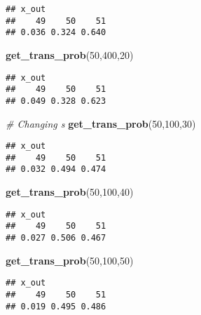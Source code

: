 \documentclass[
]{article}
\newenvironment{Shaded}{\begin{snugshade}}{\end{snugshade}}
\newcommand{\CommentTok}[1]{\textcolor[rgb]{0.56,0.35,0.01}{\textit{#1}}}
\newcommand{\DecValTok}[1]{\textcolor[rgb]{0.00,0.00,0.81}{#1}}
\newcommand{\FunctionTok}[1]{\textcolor[rgb]{0.13,0.29,0.53}{\textbf{#1}}}
\newcommand{\NormalTok}[1]{#1}
\begin{document}
\begin{verbatim}
## x_out
##    49    50    51 
## 0.036 0.324 0.640
\end{verbatim}

\begin{Shaded}
\begin{Highlighting}[]
\FunctionTok{get\_trans\_prob}\NormalTok{(}\DecValTok{50}\NormalTok{,}\DecValTok{400}\NormalTok{,}\DecValTok{20}\NormalTok{)}
\end{Highlighting}
\end{Shaded}

\begin{verbatim}
## x_out
##    49    50    51 
## 0.049 0.328 0.623
\end{verbatim}

\begin{Shaded}
\begin{Highlighting}[]
\CommentTok{\# Changing s}
\FunctionTok{get\_trans\_prob}\NormalTok{(}\DecValTok{50}\NormalTok{,}\DecValTok{100}\NormalTok{,}\DecValTok{30}\NormalTok{)}
\end{Highlighting}
\end{Shaded}

\begin{verbatim}
## x_out
##    49    50    51 
## 0.032 0.494 0.474
\end{verbatim}

\begin{Shaded}
\begin{Highlighting}[]
\FunctionTok{get\_trans\_prob}\NormalTok{(}\DecValTok{50}\NormalTok{,}\DecValTok{100}\NormalTok{,}\DecValTok{40}\NormalTok{)}
\end{Highlighting}
\end{Shaded}

\begin{verbatim}
## x_out
##    49    50    51 
## 0.027 0.506 0.467
\end{verbatim}

\begin{Shaded}
\begin{Highlighting}[]
\FunctionTok{get\_trans\_prob}\NormalTok{(}\DecValTok{50}\NormalTok{,}\DecValTok{100}\NormalTok{,}\DecValTok{50}\NormalTok{)}
\end{Highlighting}
\end{Shaded}

\begin{verbatim}
## x_out
##    49    50    51 
## 0.019 0.495 0.486
\end{verbatim}
\end{document}

